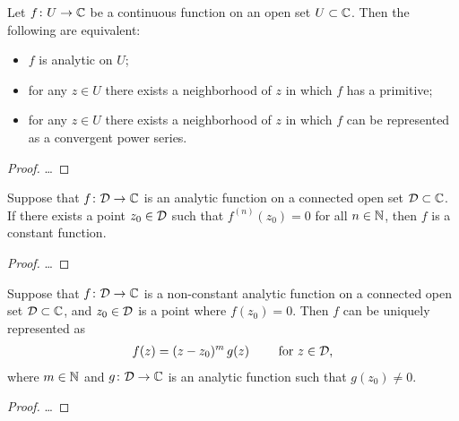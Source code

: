 \begin{theorem}
  \label{thm:TFAE_ANALYTIC}
  Let $f \colon U \to \mathbb{C}$ be a continuous function on an open
  set $U \subset \mathbb{C}$.
  Then the following are equivalent:
  \begin{itemize}
    \item $f$ is analytic on $U$;
    \item for any $z \in U$ there exists a neighborhood of $z$
      in which $f$ has a primitive;
    \item for any $z \in U$ there exists a neighborhood of $z$
      in which $f$ can be represented as a convergent power series.
  \end{itemize}
\end{theorem}
\begin{proof}
  \ldots
\end{proof}

\begin{lemma}
  \label{lem:no_vanishing_of_all_order_derivatives}
  Suppose that $f \colon \mathcal{D} \to \mathbb{C}$ is an analytic function
  on a connected open set $\mathcal{D} \subset \mathbb{C}$.
  If there exists a point $z_0 \in \mathcal{D}$
  such that $f^{(n)}(z_0) = 0$ for all $n \in \mathbb{N}$, then $f$ is a constant
  function.
\end{lemma}
\begin{proof}
  \ldots
\end{proof}

\begin{theorem}
  \label{thm:factor_theorem_for_analytic_functions}
  Suppose that $f \colon \mathcal{D} \to \mathbb{C}$ is a non-constant analytic function
  on a connected open set $\mathcal{D} \subset \mathbb{C}$, and $z_0 \in \mathcal{D}$
  is a point where $f(z_0) = 0$.
  Then $f$ can be uniquely represented as
  \begin{align*}
    f(z) = (z - z_0)^m \, g(z) \qquad \text{ for } z \in \mathcal{D} ,
  \end{align*}
  where $m \in \mathbb{N}$ and $g \colon \mathcal{D} \to \mathbb{C}$ is an analytic
  function such that $g(z_0) \ne 0$.
\end{theorem}
\begin{proof}
  \ldots
\end{proof}

